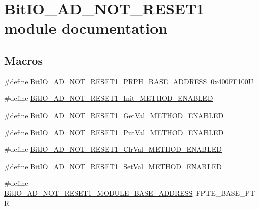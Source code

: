 \hypertarget{group___bit_i_o___a_d___n_o_t___r_e_s_e_t1__module}{\section{Bit\-I\-O\-\_\-\-A\-D\-\_\-\-N\-O\-T\-\_\-\-R\-E\-S\-E\-T1 module documentation}
\label{group___bit_i_o___a_d___n_o_t___r_e_s_e_t1__module}
}
\subsection*{Macros}
\begin{DoxyCompactItemize}
\item 
\#define \hyperlink{group___bit_i_o___a_d___n_o_t___r_e_s_e_t1__module_ga6c9b4e4a0024a4cd1fece31e0853a049}{Bit\-I\-O\-\_\-\-A\-D\-\_\-\-N\-O\-T\-\_\-\-R\-E\-S\-E\-T1\-\_\-\-P\-R\-P\-H\-\_\-\-B\-A\-S\-E\-\_\-\-A\-D\-D\-R\-E\-S\-S}~0x400\-F\-F100\-U
\item 
\#define \hyperlink{group___bit_i_o___a_d___n_o_t___r_e_s_e_t1__module_gaaa24d9f32041fff651e37c2cce9200b3}{Bit\-I\-O\-\_\-\-A\-D\-\_\-\-N\-O\-T\-\_\-\-R\-E\-S\-E\-T1\-\_\-\-Init\-\_\-\-M\-E\-T\-H\-O\-D\-\_\-\-E\-N\-A\-B\-L\-E\-D}
\item 
\#define \hyperlink{group___bit_i_o___a_d___n_o_t___r_e_s_e_t1__module_ga6a1de1d5936f58431bd5ca029cbee65f}{Bit\-I\-O\-\_\-\-A\-D\-\_\-\-N\-O\-T\-\_\-\-R\-E\-S\-E\-T1\-\_\-\-Get\-Val\-\_\-\-M\-E\-T\-H\-O\-D\-\_\-\-E\-N\-A\-B\-L\-E\-D}
\item 
\#define \hyperlink{group___bit_i_o___a_d___n_o_t___r_e_s_e_t1__module_gace40b2f69c067fe075bfea9b5f578856}{Bit\-I\-O\-\_\-\-A\-D\-\_\-\-N\-O\-T\-\_\-\-R\-E\-S\-E\-T1\-\_\-\-Put\-Val\-\_\-\-M\-E\-T\-H\-O\-D\-\_\-\-E\-N\-A\-B\-L\-E\-D}
\item 
\#define \hyperlink{group___bit_i_o___a_d___n_o_t___r_e_s_e_t1__module_gacdb9c887e13a7fd4b336a06b85135dca}{Bit\-I\-O\-\_\-\-A\-D\-\_\-\-N\-O\-T\-\_\-\-R\-E\-S\-E\-T1\-\_\-\-Clr\-Val\-\_\-\-M\-E\-T\-H\-O\-D\-\_\-\-E\-N\-A\-B\-L\-E\-D}
\item 
\#define \hyperlink{group___bit_i_o___a_d___n_o_t___r_e_s_e_t1__module_ga8cfffcf3d9cfee9dbc008c6e2bacad13}{Bit\-I\-O\-\_\-\-A\-D\-\_\-\-N\-O\-T\-\_\-\-R\-E\-S\-E\-T1\-\_\-\-Set\-Val\-\_\-\-M\-E\-T\-H\-O\-D\-\_\-\-E\-N\-A\-B\-L\-E\-D}
\item 
\#define \hyperlink{group___bit_i_o___a_d___n_o_t___r_e_s_e_t1__module_gace3723b64ccba2b8a806c39fa6a059ff}{Bit\-I\-O\-\_\-\-A\-D\-\_\-\-N\-O\-T\-\_\-\-R\-E\-S\-E\-T1\-\_\-\-M\-O\-D\-U\-L\-E\-\_\-\-B\-A\-S\-E\-\_\-\-A\-D\-D\-R\-E\-S\-S}~F\-P\-T\-E\-\_\-\-B\-A\-S\-E\-\_\-\-P\-T\-R

\end{DoxyCompactItemize}
